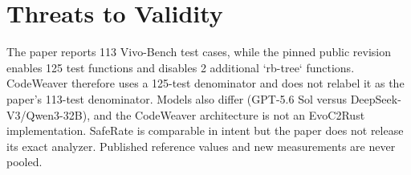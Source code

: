 \documentclass{article}
\begin{document}
\section{Threats to Validity}
The paper reports 113 Vivo-Bench test cases, while the pinned public revision enables 125 test functions and disables 2 additional `rb-tree` functions. CodeWeaver therefore uses a 125-test denominator and does not relabel it as the paper's 113-test denominator. Models also differ (GPT-5.6 Sol versus DeepSeek-V3/Qwen3-32B), and the CodeWeaver architecture is not an EvoC2Rust implementation. SafeRate is comparable in intent but the paper does not release its exact analyzer. Published reference values and new measurements are never pooled.
\end{document}
